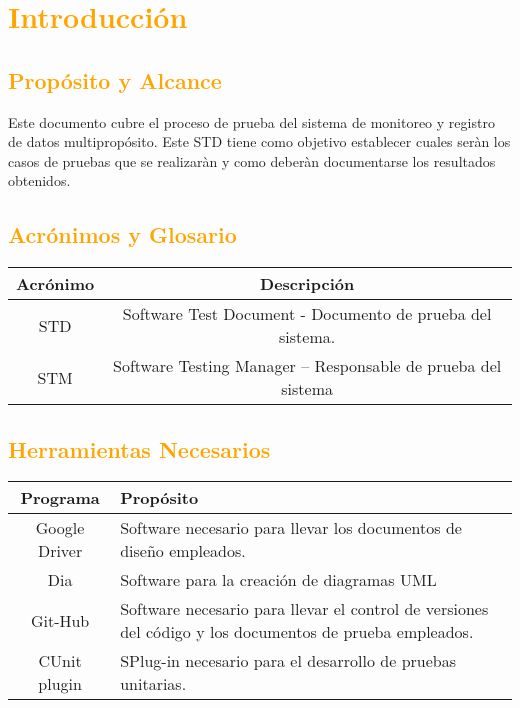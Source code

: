 \newpage
\section{\textcolor{orange}{Introducción}}
\subsection{\textcolor{orange}{Propósito y Alcance}}
Este documento cubre el proceso de prueba del sistema de monitoreo y registro de datos multipropósito. Este STD tiene como objetivo establecer cuales seràn los casos de pruebas que se realizaràn y como deberàn documentarse los resultados obtenidos.

\subsection{\textcolor{orange}{Acrónimos y Glosario}}
\begin{table}[!h]
\begin{center}
\begin{tabular}{|c|c|}
\hline
\rowcolor[RGB]{255,127,0} Acrónimo & Descripción \\
\hline
STD & Software Test Document - Documento de prueba del sistema. \\
\hline
STM & Software Testing Manager – Responsable de prueba del sistema\\
\hline
\end{tabular}
\end{center}
\end{table}

\subsection{\textcolor{orange}{Herramientas Necesarios}}
\begin{table}[!h]
\begin{center}
\begin{tabular}{|c|p{100mm}|}
\hline
\rowcolor[RGB]{255,127,0} Programa & Propósito \\
\hline
Google Driver & Software necesario para llevar los documentos de diseño empleados.\\
\hline
Dia & Software para la creación de diagramas UML\\
\hline
Git-Hub & Software necesario para llevar el control de versiones del código y los documentos de prueba empleados.\\
\hline
CUnit plugin & SPlug-in necesario para el desarrollo de pruebas unitarias.\\
\hline
\end{tabular}
\end{center}
\end{table}


